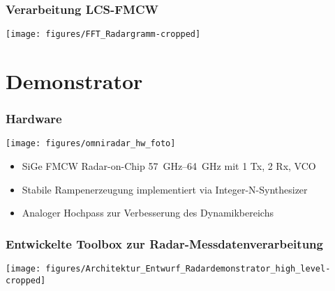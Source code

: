 \documentclass[16pt]{beamer}
\begin{document}
\begin{frame}
\frametitle{Verarbeitung LCS-FMCW}
\begin{center}
	\texttt{[image: figures/FFT\_Radargramm-cropped]}
\end{center}
\end{frame}

\section{Demonstrator}

\frame{\sectionpage}

\begin{frame}
\frametitle{Hardware}
\begin{center}
	\texttt{[image: figures/omniradar\_hw\_foto]}
\end{center}
\begin{itemize}
	\item SiGe FMCW Radar-on-Chip \@ \SIrange[range-phrase = --,range-units = single]{57}{64}{\giga\hertz} mit 1 Tx, 2 Rx, VCO
	\item Stabile Rampenerzeugung implementiert via Integer-N-Synthesizer 
	\item Analoger Hochpass zur Verbesserung des Dynamikbereichs
\end{itemize}
\end{frame}
\begin{frame}
\frametitle{Entwickelte Toolbox zur Radar-Messdatenverarbeitung}
	\begin{center}
		\texttt{[image: figures/Architektur\_Entwurf\_Radardemonstrator\_high\_level-cropped]}
	\end{center}
\end{frame}

\end{document}
